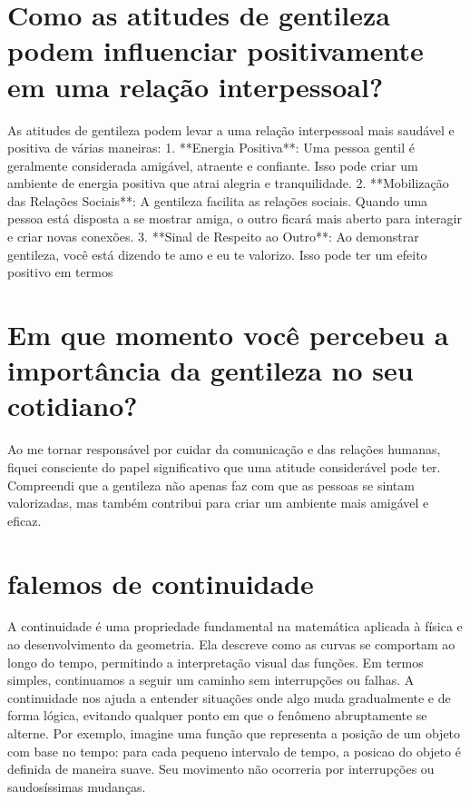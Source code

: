 \documentclass[11pt,a4paper]{article}
\begin{document}
\section{Como as atitudes de gentileza podem influenciar positivamente em uma relação interpessoal?}
As atitudes de gentileza podem levar a uma relação interpessoal mais saudável e positiva de várias maneiras: 1. **Energia Positiva**: Uma pessoa gentil é geralmente considerada amigável, atraente e confiante. Isso pode criar um ambiente de energia positiva que atrai alegria e tranquilidade. 2. **Mobilização das Relações Sociais**: A gentileza facilita as relações sociais. Quando uma pessoa está disposta a se mostrar amiga, o outro ficará mais aberto para interagir e criar novas conexões. 3. **Sinal de Respeito ao Outro**: Ao demonstrar gentileza, você está dizendo te amo e eu te valorizo. Isso pode ter um efeito positivo em termos

\section{Em que momento você percebeu a importância da gentileza no seu cotidiano?}
Ao me tornar responsável por cuidar da comunicação e das relações humanas, fiquei consciente do papel significativo que uma atitude considerável pode ter. Compreendi que a gentileza não apenas faz com que as pessoas se sintam valorizadas, mas também contribui para criar um ambiente mais amigável e eficaz.

\section{falemos de continuidade}
A continuidade é uma propriedade fundamental na matemática aplicada à física e ao desenvolvimento da geometria. Ela descreve como as curvas se comportam ao longo do tempo, permitindo a interpretação visual das funções. Em termos simples, continuamos a seguir um caminho sem interrupções ou falhas. A continuidade nos ajuda a entender situações onde algo muda gradualmente e de forma lógica, evitando qualquer ponto em que o fenômeno abruptamente se alterne. Por exemplo, imagine uma função que representa a posição de um objeto com base no tempo: para cada pequeno intervalo de tempo, a posicao do objeto é definida de maneira suave. Seu movimento não ocorreria por interrupções ou saudosíssimas mudanças.
\end{document}
